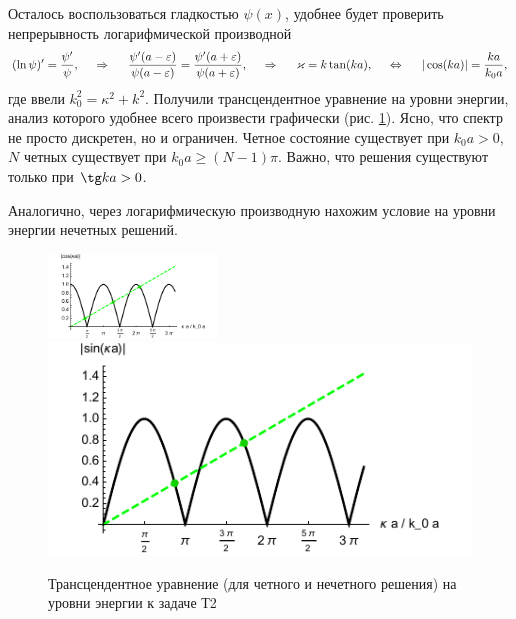 Осталось воспользоваться гладкостью $\psi(x)$, удобнее будет проверить непрерывность логарифмической производной
\begin{equation*}
    (\ln \psi)' = \frac{\psi'}{\psi},
    \hspace{0.5cm} \Rightarrow \hspace{0.5cm}
    \frac{\psi'(a-\varepsilon)}{\psi(a - \varepsilon)} = \frac{\psi'(a+\varepsilon)}{\psi(a+\varepsilon)},
    \hspace{0.5cm} \Rightarrow \hspace{0.5cm}
    \kappa = k \tan(ka),
    \hspace{5 mm}  \Leftrightarrow \hspace{5 mm} 
    |\cos(ka)| = \frac{ka}{k_0 a},
\end{equation*}
где ввели $k_0^2 = \kappa^2 + k^2$. Получили трансцендентное уравнение на уровни энергии, анализ которого удобнее всего произвести графически (рис. \ref{fig:T2}). Ясно, что спектр не просто дискретен, но и ограничен. Четное состояние существует при $k_0 a > 0$, $N$ четных существует при $k_0 a \geq (N-1) \pi$. Важно, что решения существуют только при $\tg k a > 0$.

Аналогично, через логарифмическую производную нахожим условие на уровни энергии нечетных решений.

\begin{figure}[h]
    \centering
    \includegraphics[width=0.4\textwidth]{figures/T2_1.pdf}
    \hspace{5 mm} 
    \includegraphics{figures/T2_2.pdf}
    \caption{Трансцендентное уравнение (для четного и нечетного решения) на уровни энергии к задаче Т2}
    \label{fig:T2}
\end{figure}
